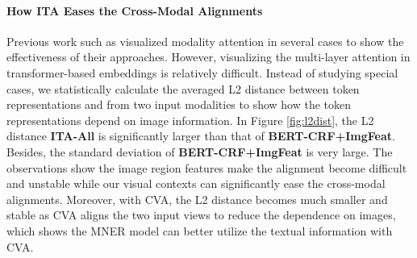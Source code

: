 \documentclass[11pt]{article}
\begin{document}
\paragraph{How ITA Eases the Cross-Modal Alignments}
Previous work such as \citet{moon-etal-2018-multimodal,Sun2021RpBERTAT} visualized modality attention in several cases to show the effectiveness of their approaches. However, visualizing the multi-layer attention in transformer-based embeddings is relatively difficult. Instead of studying special cases, we statistically calculate the averaged L2 distance between token representations  and  from two input modalities to show how the token representations depend on image information. In Figure \ref{fig:l2dist}, the L2 distance \textbf{ITA-All} is significantly larger than that of \textbf{BERT-CRF+ImgFeat}. Besides, the standard deviation of \textbf{BERT-CRF+ImgFeat} is very large. The observations show the image region features make the alignment become difficult and unstable while our visual contexts can significantly ease the cross-modal alignments. Moreover, with CVA, the L2 distance becomes much smaller and stable as CVA aligns the two input views to reduce the dependence on images, which shows the MNER model can better utilize the textual information with CVA.
\end{document}
